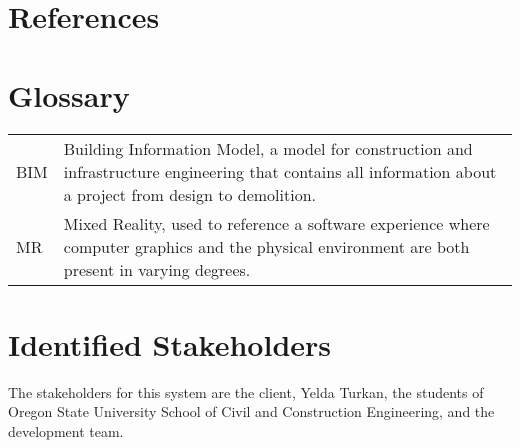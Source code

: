 \documentclass[onecolumn, draftclsnofoot,10pt, compsoc]{IEEEtran}
\begin{document}
\section{References}
\newpage
\section{Glossary}

\begin{tabular}{ p{} p{} }
 BIM & Building Information Model, a model for construction and infrastructure engineering that contains all information about a project from design to demolition. \\
 MR & Mixed Reality, used to reference a software experience where computer graphics and the physical environment are both present in varying degrees.
\end{tabular}

\newpage

\section{Identified Stakeholders}
The stakeholders for this system are the client, Yelda Turkan, the students of Oregon State University School of Civil and Construction Engineering, and the development team.\par

\end{document}
